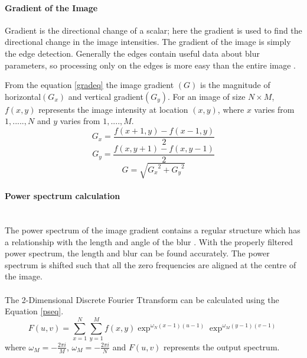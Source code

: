	\paragraph*{Gradient of the Image} \hfill \newline	
	Gradient is the directional change of a scalar; here the gradient is used to find the directional change in the image intensities. The gradient of the image is simply the edge detection. Generally the edges contain useful data about blur parameters, so processing only on the edges is more easy than the entire image \cite{Blurred image restoration}.
	\vspace{0.2cm} \par{}From the equation \ref{gradeq} the image gradient $(G)$ is the magnitude of horizontal$(G_x)$ and vertical gradient$(G_y)$. For an image of size $N\times M$, $f(x,y)$ represents the image intensity at location $(x,y)$, where $x$ varies from $1,.....,N$ and $y$ varies from $1,....,M$.
	\begin{equation}
	G_x=\frac{f(x+1,y) - f(x-1,y)}{2}
	\end{equation}
	\begin{equation}
	G_y=\frac{f(x,y+1) - f(x,y-1)}{2}
	\end{equation}
	\begin{equation}\label{gradeq}
	G = \sqrt{{G_x}^2+{G_y}^2}
	\end{equation}
	
	\paragraph*{Power spectrum calculation} \hfill \\
	The power spectrum of the image gradient contains a regular structure which has a relationship with the length and angle of the blur \cite{Blurred image restoration}. With the properly filtered power spectrum, the length and blur can be found accurately. The power spectrum is shifted such that all the zero frequencies are aligned at the centre of the image.
	\paragraph*{} The 2-Dimensional Discrete Fourier Ttransform can be calculated using the Equation \ref{pseq}.
	\begin{equation}\label{pseq}
	F(u,v)=\sum_{x=1}^{N}\sum_{y=1}^{M}f(x,y) \exp^{\omega_N (x-1)(u-1)} \exp^{\omega_M (y-1)(v-1)}
	\end{equation}
	where $\omega_M=-\frac{2\pi i}{M}$, $\omega_M=-\frac{2\pi i}{N}$ and $F(u,v)$ represents the output spectrum.
